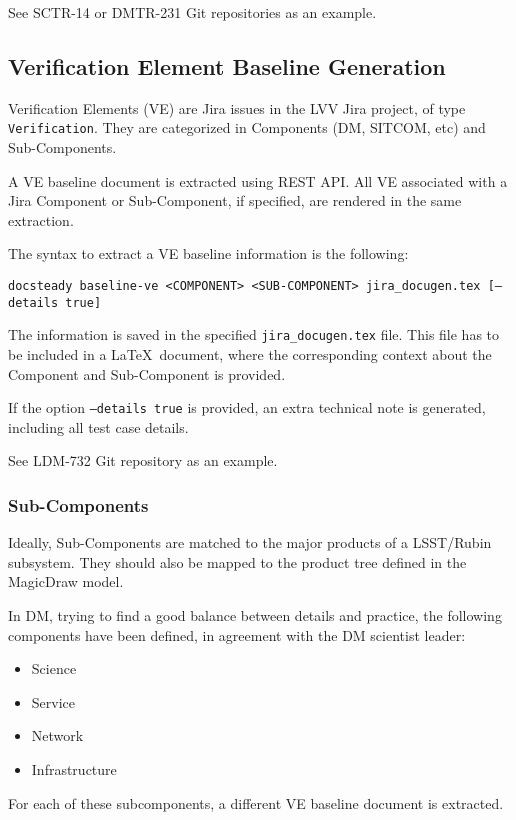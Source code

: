 \documentclass[DM]{lsstdoc}
\begin{document}
See SCTR-14 or DMTR-231 Git repositories as an example.



\subsection{Verification Element Baseline Generation}

Verification Elements (VE) are Jira issues in the LVV Jira project, of type \texttt{Verification}.
They are categorized in Components (DM, SITCOM, etc) and Sub-Components.

A VE baseline document is extracted using REST API.
All VE associated with a Jira Component or Sub-Component, if specified, are rendered in the same extraction.

The syntax to extract a VE baseline information is the following:

\texttt{docsteady baseline-ve <COMPONENT> <SUB-COMPONENT> jira\_docugen.tex [--details true]}

The information is saved in the specified \texttt{jira\_docugen.tex} file.
This file has to be included in a \LaTeX~document, where the corresponding context about the Component and Sub-Component is provided.

If the option \texttt{--details true} is provided, an extra technical note is generated, including all test case details.

See LDM-732 Git repository as an example.


\subsubsection{Sub-Components}

Ideally, Sub-Components are matched to the major products of a LSST/Rubin subsystem. 
They should also be mapped to the product tree defined in the MagicDraw model.

In DM, trying to find a good balance between details and practice, the following components have been defined, in agreement with the DM scientist leader:

\begin{itemize}
\item Science
\item Service
\item Network
\item Infrastructure
\end{itemize}

For each of these subcomponents, a different VE baseline document is extracted.
\end{document}
